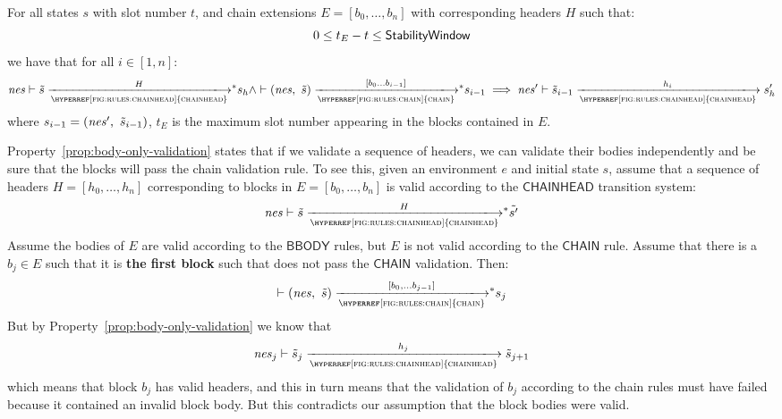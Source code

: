 \begin{property}\label{prop:body-only-validation}
  For all states $s$ with slot number $t$, and chain
  extensions $E = [b_0, \ldots, b_n]$ with corresponding headers $H$ such that:
  $$
  0 \leq t_E - t  \leq \mathsf{StabilityWindow}
  $$
  we have that for all $i \in [1, n]$:
  $$
  \var{nes} \vdash \tilde{s} \transtar{\hyperref[fig:rules:chainhead]{chainhead}}{H} s_{h}
  \wedge
  \vdash (\var{nes},~\tilde{s}) \transtar{\hyperref[fig:rules:chain]{chain}}{[b_0 \ldots b_{i-1}]} s_{i-1}
  \implies
  \var{nes'} \vdash \tilde{s}_{i-1}\trans{\hyperref[fig:rules:chainhead]{chainhead}}{h_i} s'_{h}
  $$
  where $s_{i-1}=(\mathit{nes'},~\tilde{s}_{i-1})$,
  $t_E$ is the maximum slot number appearing in the blocks contained in $E$.
\end{property}

Property~\ref{prop:body-only-validation} states that if we validate a sequence
of headers, we can validate their bodies independently and be sure that the
blocks will pass the chain validation rule. To see this, given an environment
$e$ and initial state $s$, assume that a sequence of headers
$H = [h_0, \ldots, h_n]$ corresponding to blocks in $E = [b_0, \ldots, b_n]$ is
valid according to the $\mathsf{CHAINHEAD}$ transition system:
%
$$
\var{nes} \vdash \tilde{s} \transtar{\hyperref[fig:rules:chainhead]{chainhead}}{H} \tilde{s'}
$$
%
Assume the bodies of $E$ are valid
according to the $\mathsf{BBODY}$ rules, but $E$ is not valid according to
the $\mathsf{CHAIN}$ rule. Assume that there is a $b_j \in E$ such that it is
\textbf{the first block} such that does not pass the $\mathsf{CHAIN}$
validation. Then:
%
$$
\vdash (\var{nes},~\tilde{s}) \transtar{\hyperref[fig:rules:chain]{chain}}{[b_0, \ldots b_{j-1}]} s_j
$$
But by Property~\ref{prop:body-only-validation} we know that
%
$$
\var{nes}_j \vdash \tilde{s}_j \trans{\hyperref[fig:rules:chainhead]{chainhead}}{h_j} \tilde{s}_{j+1}
$$
which means that block $b_j$ has valid headers, and this in turn means that the
validation of $b_j$ according to the chain rules must have failed because it
contained an invalid block body. But this contradicts our assumption that the
block bodies were valid.

\clearpage

